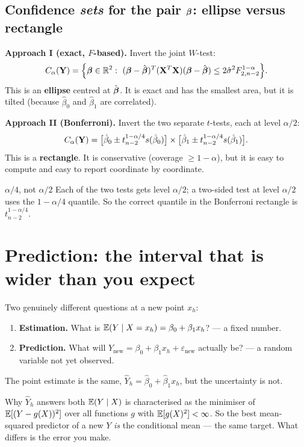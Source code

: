 \documentclass[11pt]{article}
\begin{document}
\subsection{Confidence \emph{sets} for the pair $\boldsymbol{\beta}$: ellipse versus rectangle}

\textbf{Approach I (exact, $F$-based).} Invert the joint $W$-test:
\[
  C_\alpha(\bY)=\Big\{\bb\in\R^2:\ (\bb-\hat\bb)^T(\bX^T\bX)(\bb-\hat\bb)
   \le 2\hat\sigma^2 F^{1-\alpha}_{2,n-2}\Big\}.
\]
This is an \textbf{ellipse} centred at $\hat{\boldsymbol{\beta}}$. It is exact and has the smallest area,
but it is tilted (because $\hat\beta_0$ and $\hat\beta_1$ are correlated).

\textbf{Approach II (Bonferroni).} Invert the two separate $t$-tests, each at level $\alpha/2$:
\[
  C_\alpha(\mathbf{Y})=\big[\hat\beta_0\pm t^{1-\alpha/4}_{n-2}s(\hat\beta_0)\big]
  \times \big[\hat\beta_1\pm t^{1-\alpha/4}_{n-2}s(\hat\beta_1)\big].
\]
This is a \textbf{rectangle}. It is conservative (coverage $\ge 1-\alpha$), but it is easy
to compute and easy to report coordinate by coordinate.

\begin{confusion}{$\alpha/4$, not $\alpha/2$}
Each of the two tests gets level $\alpha/2$; a two-sided test at level $\alpha/2$ uses the
$1-\alpha/4$ quantile. So the correct quantile in the Bonferroni rectangle is
$t^{1-\alpha/4}_{n-2}$.
\end{confusion}

\section{Prediction: the interval that is wider than you expect}

Two genuinely different questions at a new point $x_h$:
\begin{enumerate}
  \item \textbf{Estimation.} What is $\mathbb{E}(Y\mid X=x_h)=\beta_0+\beta_1x_h$? --- a fixed number.
  \item \textbf{Prediction.} What will $Y_{\text{new}}=\beta_0+\beta_1x_h+\varepsilon_{\text{new}}$
        actually be? --- a random variable not yet observed.
\end{enumerate}
The point estimate is the same, $\hat Y_h = \hat\beta_0+\hat\beta_1x_h$, but the uncertainty
is not.

\begin{idea}{Why $\hat Y_h$ answers both}
$\mathbb{E}(Y\mid X)$ is characterised as the minimiser of $\mathbb{E}[(Y-g(X))^2]$ over all functions $g$
with $\mathbb{E}[g(X)^2]<\infty$. So the best mean-squared predictor of a new $Y$ \emph{is} the
conditional mean --- the same target. What differs is the error you make.
\end{idea}
\end{document}
